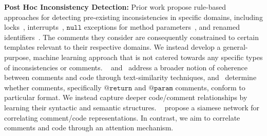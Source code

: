 \documentclass[letterpaper]{article} %
\makeatletter
\newcommand{\CodeIn}[1]{{\ifmmode{\mathtt{#1}}\else$\mathtt{#1}$\fi}}
\newcommand{\Return}{\CodeIn{@return}}
\newcommand{\Param}{\CodeIn{@param}}
\makeatother
\begin{document}
\noindent\textbf{Post Hoc Inconsistency Detection:}
\vspace{-3.31mm}
Prior work propose rule-based approaches for detecting pre-existing inconsistencies in specific domains, including locks~\cite{icomment2007}, interrupts~\cite{aComment}, \CodeIn{null} exceptions for method parameters~\cite{ZhouParameter,tComment}, and renamed identifiers~\cite{ratol2017fragile}. The comments they consider are consequently constrained to certain templates relevant to their respective domains. We instead develop a general-purpose, machine learning approach that is not catered towards any specific types of inconsistencies or comments. \citeauthor{Corazza18}~ and~\citet{Cimasa19} address a broader notion of coherence between comments and code through text-similarity techniques, and~\citet{Khamis2010AutomaticQA} determine whether comments, specifically \Return{} and \Param{} comments, conform to particular format. We instead capture deeper code/comment relationships by learning their syntactic and semantic structures. ~\citet{RabbiInconsistencySiamese} propose a siamese network
for correlating comment/code representations. In contrast, we aim to correlate comments and code through an attention mechanism.
\end{document}
